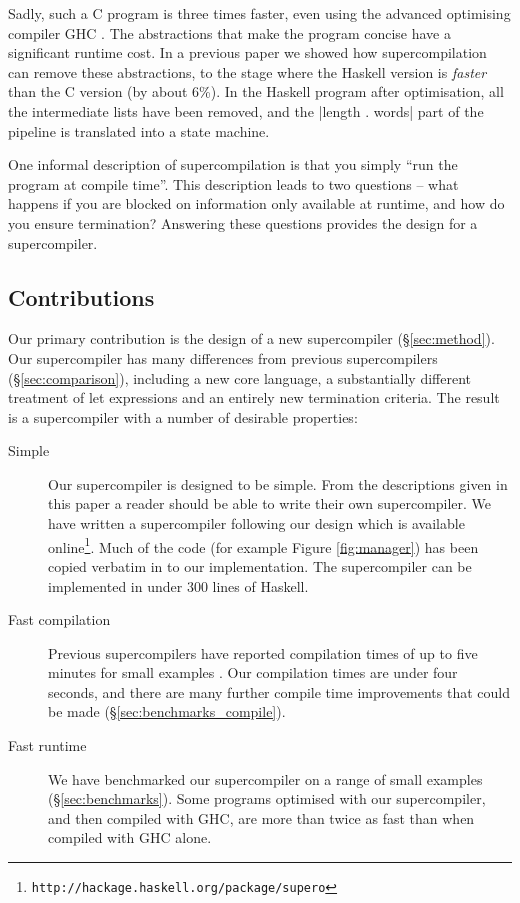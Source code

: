 \documentclass[draft]{sigplanconf}
\begin{document}
Sadly, such a C program is three times faster, even using the advanced optimising compiler GHC \cite{ghc6_12}. The abstractions that make the program concise have a significant runtime cost. In a previous paper \cite{me:supero} we showed how supercompilation can remove these abstractions, to the stage where the Haskell version is \textit{faster} than the C version (by about 6\%). In the Haskell program after optimisation, all the intermediate lists have been removed, and the |length . words| part of the pipeline is translated into a state machine.

One informal description of supercompilation is that you simply ``run the program at compile time''. This description leads to two questions -- what happens if you are blocked on information only available at runtime, and how do you ensure termination? Answering these questions provides the design for a supercompiler.

\subsection{Contributions}

Our primary contribution is the design of a new supercompiler (\S\ref{sec:method}). Our supercompiler has many differences from previous supercompilers (\S\ref{sec:comparison}), including a new core language, a substantially different treatment of let expressions and an entirely new termination criteria. The result is a supercompiler with a number of desirable properties:

\begin{description}
\item[Simple] Our supercompiler is designed to be simple. From the descriptions given in this paper a reader should be able to write their own supercompiler. We have written a supercompiler following our design which is available online\footnote{\verb"http://hackage.haskell.org/package/supero"}. Much of the code (for example Figure \ref{fig:manager}) has been copied verbatim in to our implementation. The supercompiler can be implemented in under 300 lines of Haskell.
\item[Fast compilation] Previous supercompilers have reported compilation times of up to five minutes for small examples \cite{me:supero}. Our compilation times are under four seconds, and there are many further compile time improvements that could be made (\S\ref{sec:benchmarks_compile}).
\item[Fast runtime] We have benchmarked our supercompiler on a range of small examples (\S\ref{sec:benchmarks}). Some programs optimised with our supercompiler, and then compiled with GHC, are more than twice as fast than when compiled with GHC alone.
\end{description}
\end{document}

